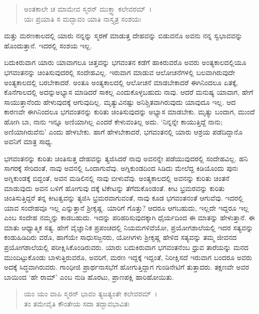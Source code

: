 \begin{verse}
ಅಂತಕಾಲೇ ಚ ಮಾಮೇವ ಸ್ಮರನ್ ಮುಕ್ತ್ವಾ ಕಲೇವರಮ್~।\\ಯಃ ಪ್ರಯಾತಿ ಸ ಮದ್ಭಾವಂ ಯಾತಿ ನಾಸ್ತ್ಯತ್ರ ಸಂಶಯಃ 
\end{verse}

{\small ಮತ್ತು ಮರಣಕಾಲದಲ್ಲಿ ಯಾರು ನನ್ನನ್ನು ಸ್ಮರಣೆ ಮಾಡುತ್ತ ದೇಹವನ್ನು ಬಿಡುವನೊ ಅವನು ನನ್ನ ಸ್ವಭಾವವನ್ನು ಹೊಂದುತ್ತಾನೆ. ಇದರಲ್ಲಿ ಸಂಶಯ ಇಲ್ಲ.}

ಬದುಕಿರುವಾಗ ಯಾರು ಯಾವಾಗಲೂ ಚಿತ್ತವನ್ನು ಭಗವಂತನ ಕಡೆಗೆ ಹಾಕಿರುವರೊ ಅವರು ಅಂತ್ಯಕಾಲದಲ್ಲಿಯೂ ಭಗವಂತನನ್ನು ಚಿಂತಿಸುವುದರಲ್ಲಿ ಸಂದೇಹವಿಲ್ಲ. ಇರುವಾಗ ಮಾಡುವ ಆಲೋಚನೆಗಳಲ್ಲಿ ಬಲವಾಗಿರುವುದೇ ಅಂತ್ಯಕಾಲದಲ್ಲಿ ಬರಬೇಕಾದರೆ. ಅಂತೂ ಅಂತ್ಯಕಾಲದಲ್ಲಿ ಆಲೋಚನೆ ಮಾಡಬೇಕಾದರೆ ಈಗಿನಿಂದಲೂ ಏತಕ್ಕೆ, ಕೊನೆಗಾಲದಲ್ಲಿ ಅದನ್ನುಅಭ್ಯಾಸ ಮಾಡಿದರೆ ಸಾಕಲ್ಲ ಎಂದುಕೊಳ್ಳಬಹುದು ನಾವು. ಆದರೆ ಮನುಷ್ಯ ಯಾವಾಗ, ಹೇಗೆ ಸಾಯುತ್ತಾನೆಂದು ಹೇಳುವುದಕ್ಕೆ ಆಗುವುದಿಲ್ಲ. ಮೃತ್ಯುವಿನಷ್ಟು ಅನಿಶ್ಚಿತವಾಗಿರುವುದು ಯಾವುದೂ ಇಲ್ಲ. ಆದ ಕಾರಣವೇ ಈಗಿನಿಂದಲೂ ಭಗವಂತನನ್ನು ಕುರಿತು ಚಿಂತಿಸುವುದನ್ನು ಅಭ್ಯಾಸ ಮಾಡಬೇಕು. ಮೃತ್ಯು ಬಂದಾಗ, ಮುಂದೆ ಹೋಗಿ ಬಾ, ನಾನು ಇನ್ನೂ ಅಣಿಯಾಗಿಲ್ಲ ಎಂದರೆ ಕೇಳುವಂತಿಲ್ಲ ಅದು. ‘ನಿನ್ನನ್ನೇ ಕಾಯುತ್ತಿದ್ದೆ ನಾನು; ಅಣಿಯಾಗಿರುವೆನು’ ಎಂದು ಹೇಳಬೇಕು. ಹಾಗೆ ಹೇಳಬೇಕಾದರೆ, ಭಗವಂತನಲ್ಲಿ ಯಾರು ಆಶ್ರಯ ಪಡೆದಿದ್ದಾನೊ ಅವನಿಗೆ ಮಾತ್ರ ಸಾಧ್ಯ.

ಭಗವಂತನನ್ನು ಕುರಿತು ಚಿಂತಿಸುತ್ತ ದೇಹವನ್ನು ತ್ಯಜಿಸಿದರೆ ನಾವು ಅವನನ್ನೇ ಪಡೆಯುವುದರಲ್ಲಿ ಸಂದೇಹವಿಲ್ಲ. ಹನಿ ಸಾಗರಕ್ಕೆ ಸೇರಿದಂತೆ, ನಾವು ಅವನಲ್ಲಿ ಒಂದಾಗುವೆವು. ಅಗ್ನಿಕುಂಡದಿಂದ ಸಿಡಿದು ಮೇಲೆದ್ದ ಕಿಡಿಯೊಂದು ಪುನಃ ಅಗ್ನಿಕುಂಡಕ್ಕೆ ಬಿದ್ದಂತೆ, ಅವನ ಮಡಿಲಿನಲ್ಲಿ ನಾವು ಬೀಳುವೆವು. ಅಂತ್ಯಕಾಲದಲ್ಲಿ ಅವನನ್ನು ಕುರಿತು ಚಿಂತನೆ ಮಾಡುವುದು ಅವನ ಬಳಿಗೆ ಹೋಗುವು ದಕ್ಕೆ ಟಿಕೇಟನ್ನು ತೆಗೆದುಕೊಂಡಂತೆ. ಕೀಟ ಭ್ರಮರವನ್ನು ಕುರಿತು ಚಿಂತಿಸುತ್ತಿದ್ದರೆ ತನ್ನ ಕೀಟತ್ವವನ್ನು ತ್ಯಜಿಸಿ ಭ್ರಮರವಾಗುವಂತೆ, ನಾವು ಕೂಡ ಭಗವಂತನಂತೆ ಆಗುವೆವು. ಇದರಲ್ಲಿ ಯಾವ ಸಂದೇಹವೂ ಇಲ್ಲ ಎನ್ನುತ್ತಾನೆ ಶ‍್ರೀಕೃಷ್ಣ. ಯಾರಿಗೆ ಗೊತ್ತು? ಆದರೂ ಆಗಬಹುದು, ಇಲ್ಲದೇ ಇದ್ದರೂ ಇಲ್ಲ ಎಂಬ ಸಂದೇಹ ನಮ್ಮನ್ನು ಕಾಡಬಹುದು. ಇದನ್ನು ಪರಿಹರಿಸುವುದಕ್ಕಾಗಿ ಧೈರ್ಯದಿಂದ ಈ ಮಾತನ್ನು ಹೇಳುತ್ತಾನೆ. ಈ ಮಾತು ಆಧ್ಯಾತ್ಮಿಕ ಸತ್ಯ. ಹೇಗೆ ವೈಜ್ಞಾನಿಕ ಪ್ರಪಂಚದಲ್ಲಿ ನಿಯಮಗಳಿವೆಯೋ, ಪ್ರಯೋಗಶಾಲೆಯಲ್ಲಿ ಇದರ ಸತ್ಯವನ್ನು ಕಂಡುಹಿಡಿದಿರು ವರೊ, ಹಾಗೆಯೇ ಸಾಧುಸಜ್ಜನರು, ಯೋಗಿಗಳು ಶ‍್ರೀಕೃಷ್ಣ ಹೇಳಿದ ಸತ್ಯವನ್ನು ತಮ್ಮ ಜೀವನದ ಪ್ರಯೋಗಶಾಲೆಯಲ್ಲಿ ಪರೀಕ್ಷಿಸಿಕೊಂಡಿರುವರು. ಯಾರು ಬದುಕಿರುವಾಗ ಭಗವಂತನೆಂಬ ಧ್ರುವ ತಾರೆಯನ್ನು ಮನದ ಮುಂದಿಟ್ಟುಕೊಂಡು ಬಾಳುತ್ತಿರುವರೊ, ಅವರಿಗೆ, ಮರಣ ಇದ್ದಕ್ಕೆ ಇದ್ದಂತೆ, ನಿರೀಕ್ಷಿಸದೆ ಇರುವಾಗ ಬಂದರೂ ಅವರು ಅದಕ್ಕೆ ಸಿದ್ಧವಾಗಿರುವರು. ಗಾಂಧೀಜಿ ಪ್ರಾರ್ಥನಾಸಭೆಗೆ ಹೋಗುತ್ತಿದ್ದಾಗ ಗುಂಡಿನೇಟಿಗೆ ತುತ್ತಾದರು. ತಕ್ಷಣವೇ ಅವರ ಬಾಯಿಂದ ‘ಹೇ ರಾಮ್​’ ಎಂಬ ನುಡಿ ಹೊರಟು, ಪ್ರಾಣಪಕ್ಷಿ ಹಾರಿಹೋಯಿತು.

\begin{verse}
ಯಂ ಯಂ ವಾಪಿ ಸ್ಮರನ್ ಭಾವಂ ತ್ಯಜತ್ಯಂತೇ ಕಲೇವರಮ್~।\\ತಂ ತಮೇವೈತಿ ಕೌಂತೇಯ ಸದಾ ತದ್ಭಾವಭಾವಿತಃ 
\end{verse}

